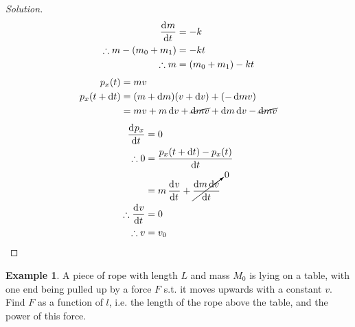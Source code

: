\documentclass[fleqn, a4paper, 12pt, draft]{article}
\theoremstyle{definition}
\newtheorem{example}{Example}
\theoremstyle{theorem}
\newenvironment{solution}
{\begin{proof}[Solution]\let\qed\relax}
	{\end{proof}}
\begin{document}
\begin{solution}
	\begin{align*}
		\dod{m}{t} &= -k\\
		\therefore m - (m_0 + m_1) &= -kt\\
		\therefore m &= (m_0 + m_1) -kt
	\end{align*}
	\begin{align*}
		p_x(t) &= m v\\
		p_x(t + \dif t) &= (m + \dif m) (v + \dif v) + (-\dif m v)\\
		&= m v + m \dif v + \cancel{\dif m v} + \dif m \dif v - \cancel{\dif m v}
	\end{align*}
	\begin{align*}
		\dod{p_x}{t} &= 0\\
		\therefore 0 &= \dfrac{p_x(t + \dif t) - p_x(t)}{\dif t}\\
		&= m \dod{v}{t} + \cancelto{0}{\dfrac{\dif m \dif v}{\dif t}}\\
		\therefore \dod{v}{t} &= 0\\
		\therefore v &= v_0
	\end{align*}
\end{solution}

\begin{example}
	A piece of rope with length $L$ and mass $M_0$ is lying on a table, with one end being pulled up by a force $F$ s.t. it moves upwards with a constant $v$. Find $F$ as a function of $l$, i.e. the length of the rope above the table, and the power of this force.
\end{example}
\end{document}
